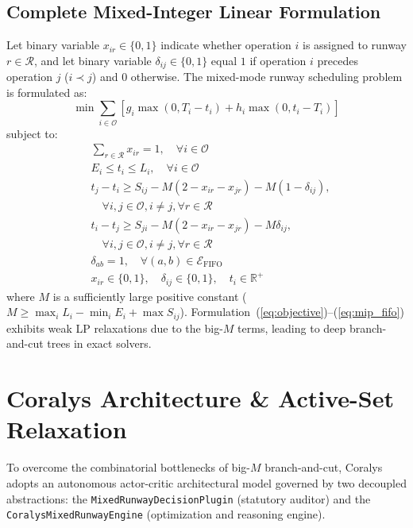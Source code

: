 \documentclass[10pt,journal,compsoc]{IEEEtran}
\begin{document}
\subsection{Complete Mixed-Integer Linear Formulation}
Let binary variable $x_{ir} \in \{0, 1\}$ indicate whether operation $i$ is assigned to runway $r \in \mathcal{R}$, and let binary variable $\delta_{ij} \in \{0, 1\}$ equal $1$ if operation $i$ precedes operation $j$ ($i \prec j$) and $0$ otherwise. The mixed-mode runway scheduling problem is formulated as:
\begin{equation}
\min \sum_{i \in \mathcal{O}} \left[ g_i \max(0, T_i - t_i) + h_i \max(0, t_i - T_i) \right]
\label{eq:objective}
\end{equation}
subject to:
\begin{align}
& \sum_{r \in \mathcal{R}} x_{ir} = 1, \quad \forall i \in \mathcal{O} \label{eq:mip_assign} \\
& E_i \le t_i \le L_i, \quad \forall i \in \mathcal{O} \label{eq:mip_win} \\
& t_j - t_i \ge S_{ij} - M(2 - x_{ir} - x_{jr}) - M(1 - \delta_{ij}), \nonumber \\
& \quad \forall i, j \in \mathcal{O}, i \ne j, \forall r \in \mathcal{R} \label{eq:mip_sep1} \\
& t_i - t_j \ge S_{ji} - M(2 - x_{ir} - x_{jr}) - M \delta_{ij}, \nonumber \\
& \quad \forall i, j \in \mathcal{O}, i \ne j, \forall r \in \mathcal{R} \label{eq:mip_sep2} \\
& \delta_{ab} = 1, \quad \forall (a, b) \in \mathcal{E}_{\text{FIFO}} \label{eq:mip_fifo} \\
& x_{ir} \in \{0, 1\}, \quad \delta_{ij} \in \{0, 1\}, \quad t_i \in \mathbb{R}^+
\end{align}
where $M$ is a sufficiently large positive constant ($M \ge \max_{i} L_i - \min_{i} E_i + \max S_{ij}$). Formulation~(\ref{eq:objective})--(\ref{eq:mip_fifo}) exhibits weak LP relaxations due to the big-$M$ terms, leading to deep branch-and-cut trees in exact solvers.

\section{Coralys Architecture \& Active-Set Relaxation}
\label{sec:coralys_architecture}

To overcome the combinatorial bottlenecks of big-$M$ branch-and-cut, Coralys adopts an autonomous actor-critic architectural model governed by two decoupled abstractions: the \texttt{MixedRunwayDecisionPlugin} (statutory auditor) and the \texttt{CoralysMixedRunwayEngine} (optimization and reasoning engine).
\end{document}
